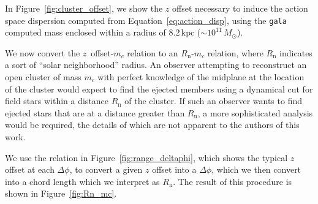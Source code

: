\documentclass[twocolumn]{aastex62}
\newcommand{\kpc}{\text{kpc}}
\newcommand{\n}{\text{n}}
\begin{document}
In Figure~\ref{fig:cluster_offset}, we show the $z$ offset necessary to induce
the action space dispersion computed from Equation~\ref{eq:action_disp}, using
the \texttt{gala} computed mass enclosed within a radius of $8.2\,\kpc$ ($\sim
10^{11}\,M_{\odot}$).

We now convert the $z$~offset-$m_c$ relation to an $R_{\n}$-$m_c$ relation,
where $R_{\n}$ indicates a sort of ``solar neighborhood'' radius. An observer
attempting to reconstruct an open cluster of mass $m_c$ with perfect knowledge
of the midplane at the location of the cluster would expect to find the
ejected members using a dynamical cut for field stars within a distance
$R_{\n}$ of the cluster. If such an observer wants to find ejected stars that
are at a distance greater than $R_{\n}$, a more sophisticated analysis would
be required, the details of which are not apparent to the authors of this
work.

We use the relation in Figure~\ref{fig:range_deltaphi}, which shows the
typical $z$ offset at each $\Delta \phi$, to convert a given $z$ offset into a
$\Delta\phi$, which we then convert into a chord length which we interpret as
$R_{\n}$. The result of this procedure is shown in Figure~\ref{fig:Rn_mc}.

\begin{figure*}
\caption{Caption.}
\label{fig:Rn_mc}
\end{figure*}



\end{document}
